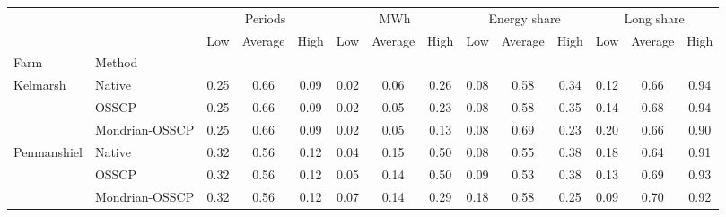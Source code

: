 \begin{tabular}{@{}llcccccccccccc@{}}
\toprule
 &  & \multicolumn{3}{c}{Periods} & \multicolumn{3}{c}{MWh} & \multicolumn{3}{c}{Energy share} & \multicolumn{3}{c}{Long share} \\
 &  & Low & Average & High & Low & Average & High & Low & Average & High & Low & Average & High \\
Farm & Method &  &  &  &  &  &  &  &  &  &  &  &  \\
\midrule
\multirow[t]{3}{*}{Kelmarsh} & Native & 0.25 & 0.66 & 0.09 & 0.02 & 0.06 & 0.26 & 0.08 & 0.58 & 0.34 & 0.12 & 0.66 & 0.94 \\
 & OSSCP & 0.25 & 0.66 & 0.09 & 0.02 & 0.05 & 0.23 & 0.08 & 0.58 & 0.35 & 0.14 & 0.68 & 0.94 \\
 & Mondrian-OSSCP & 0.25 & 0.66 & 0.09 & 0.02 & 0.05 & 0.13 & 0.08 & 0.69 & 0.23 & 0.20 & 0.66 & 0.90 \\
\cmidrule{1-14}
\multirow[t]{3}{*}{Penmanshiel} & Native & 0.32 & 0.56 & 0.12 & 0.04 & 0.15 & 0.50 & 0.08 & 0.55 & 0.38 & 0.18 & 0.64 & 0.91 \\
 & OSSCP & 0.32 & 0.56 & 0.12 & 0.05 & 0.14 & 0.50 & 0.09 & 0.53 & 0.38 & 0.13 & 0.69 & 0.93 \\
 & Mondrian-OSSCP & 0.32 & 0.56 & 0.12 & 0.07 & 0.14 & 0.29 & 0.18 & 0.58 & 0.25 & 0.09 & 0.70 & 0.92 \\
\cmidrule{1-14}
\bottomrule
\end{tabular}
